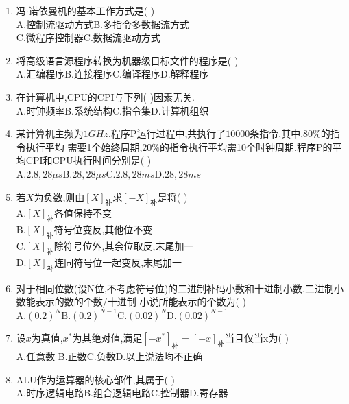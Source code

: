 \documentclass[12pt, a4paper, oneside, UTF8]{ctexbook}
\begin{document}
\begin{enumerate}
    \item 冯$\cdot$诺依曼机的基本工作方式是(  ) \\
    A.控制流驱动方式\qquad B.多指令多数据流方式 \\
    C.微程序控制器\qquad C.数据流驱动方式 
    
    \item \bt 将高级语言源程序转换为机器级目标文件的程序是(   ) \\
    A.汇编程序\qquad B.连接程序\qquad C.编译程序\qquad D.解释程序 

    \item 在计算机中,CPU的CPI与下列(   )因素无关.\\
    A.时钟频率\qquad B.系统结构\qquad C.指令集\qquad D.计算机组织 

    \item 某计算机主频为$1GHz$,程序P运行过程中,共执行了$10000$条指令,其中,$80\%$的指令执行平均
    需要1个始终周期,$20\%$的指令执行平均需10个时钟周期.程序P的平均CPI和CPU执行时间分别是(   ) \\
    A.$2.8,28\mu s$\qquad B.$28,28\mu s$\qquad C.$2.8,28ms$\qquad D.$28,28ms$ 

    \item 若$X$为负数,则由$[X]_{\text{补}}$求$[-X]_{\text{补}}$是将(   ) \\
    A.$[X]_{\text{补}}$各值保持不变 \\
    B.$[X]_{\text{补}}$符号位变反,其他位不变 \\
    C.$[X]_{\text{补}}$除符号位外,其余位取反,末尾加一 \\
    D.$[X]_{\text{补}}$连同符号位一起变反,末尾加一 

    \item 对于相同位数(设N位,不考虑符号位)的二进制补码小数和十进制小数,二进制小数能表示的数的个数/十进制
    小说所能表示的个数为(  ) \\
    A.$(0.2)^{N}$\qquad B.$(0.2)^{N-1}$\qquad C.$(0.02)^{N}$\qquad D.$(0.02)^{N-1}$ 

    \item 设$x$为真值,$x^{*}$为其绝对值,满足$[-x^*]_{\text{补}}=[-x]_{\text{补}}$当且仅当x为(   ) \\
    A.任意数 \qquad B.正数\qquad C.负数\qquad D.以上说法均不正确

    \item ALU作为运算器的核心部件,其属于(   ) \\
    A.时序逻辑电路\qquad B.组合逻辑电路\qquad C.控制器\qquad D.寄存器 


\end{enumerate}
\end{document}
